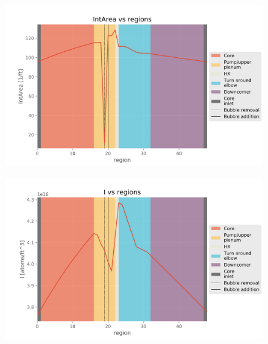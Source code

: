 \begin{figure}[ht] 
\centering
\begin{minipage}{.5\textwidth}
  \centering
  \includegraphics[width=1.0\linewidth]{images/BaseCaseIntArea.png}
  \label{fig:BaseCaseIntAreaCon}
\end{minipage}%
\begin{minipage}{.5\textwidth}
  \centering
  \includegraphics[width=1.0\linewidth]{images/BaseCaseI.png}
  \label{fig:BaseCaseI}
\end{minipage}
\end{figure}

